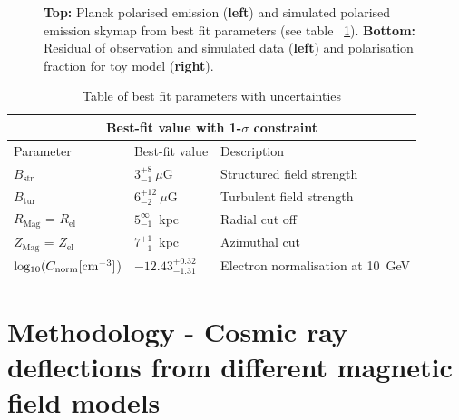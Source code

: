 \documentclass[12pt, a4 paper]{mnras}
\begin{document}
\begin{figure}
\caption{\textbf{Top:} Planck polarised emission (\textbf{left}) and simulated polarised emission skymap from best fit parameters (see table ~\ref{Para_table}). \textbf{Bottom:} Residual of observation and simulated data (\textbf{left}) and polarisation fraction for toy model (\textbf{right}).}
\label{fig:Skymaps}
\end{figure}



\begin{table}
\centering
\caption{Table of best fit parameters with uncertainties}
\begin{tabular}{ |p{}|p{4.5cm}|p{6.5cm}|  }
\hline
\multicolumn{3}{|c|}{Best-fit value with 1-$\sigma$ constraint} \\
\hline
Parameter & Best-fit value &Description \\
\hline
\hline
$B_{\mathrm{str}} $& $3_{-1}^{+8} ~ \mu$G & Structured field strength \\
\hline
$B_{\mathrm{tur}} $& $ 6_{-2}^{+12} ~\mu$G & Turbulent field strength\\
\hline
$R_{\mathrm{Mag}}$ = $R_{\mathrm{el}}$ & $5_{-1}^{\infty}$~kpc & Radial cut off \\
\hline
$Z_{\mathrm{Mag}}$ = $Z_{\mathrm{el}}$ & $7_{-1}^{+1}$~kpc & Azimuthal cut\\
\hline
\rule{0pt}{3ex} 
${\rm{log_{10}}}(C_{\rm norm} [{\rm cm}^{-3}]$) & ${-12.43}_{{-1.31}}^{{+0.32}}$ & Electron normalisation at 10~GeV\\
\hline
\end{tabular}
\label{Para_table}
\end{table}

\section{Methodology - Cosmic ray deflections from different magnetic field models}
\label{Deflections}
\end{document}
